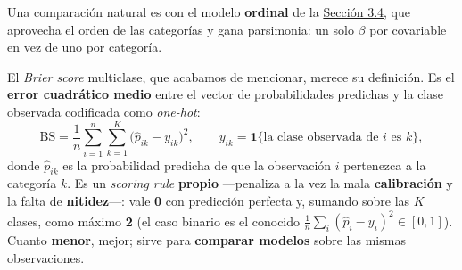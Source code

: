 \documentclass[
  letterpaper,
  DIV=11,
  numbers=noendperiod]{scrartcl}
\begin{document}
Una comparación natural es con el modelo \textbf{ordinal} de la
\protect\hyperlink{sec-u13-ordinal}{Sección 3.4}, que aprovecha el orden
de las categorías y gana parsimonia: un solo \(\beta\) por covariable en
vez de uno por categoría.

El \emph{Brier score} multiclase, que acabamos de mencionar, merece su
definición. Es el \textbf{error cuadrático medio} entre el vector de
probabilidades predichas y la clase observada codificada como
\emph{one-hot}: \[
\text{BS}=\frac{1}{n}\sum_{i=1}^{n}\sum_{k=1}^{K}\bigl(\hat p_{ik}-y_{ik}\bigr)^2,
\qquad y_{ik}=\mathbf 1\{\text{la clase observada de }i\text{ es }k\},
\] donde \(\hat p_{ik}\) es la probabilidad predicha de que la
observación \(i\) pertenezca a la categoría \(k\). Es un \emph{scoring
rule} \textbf{propio} ---penaliza a la vez la mala \textbf{calibración}
y la falta de \textbf{nitidez}---: vale \textbf{0} con predicción
perfecta y, sumando sobre las \(K\) clases, como máximo \textbf{2} (el
caso binario es el conocido \(\tfrac1n\sum_i(\hat p_i-y_i)^2\in[0,1]\)).
Cuanto \textbf{menor}, mejor; sirve para \textbf{comparar modelos} sobre
las mismas observaciones.
\end{document}
